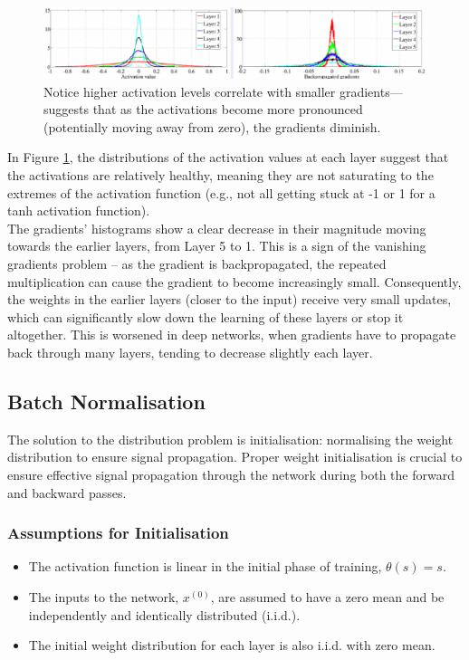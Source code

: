 \begin{figure}[H]
    \centering
    \includegraphics[width=0.75\linewidth]{img/activationgradienthistograms.png}
    \caption{Notice  higher activation levels correlate with smaller gradients—suggests that as the activations become more pronounced (potentially moving away from zero), the gradients diminish. }
    \label{fig:accgradhis}
\end{figure}

In Figure \ref{fig:accgradhis}, the distributions of the activation values at each layer suggest that the activations are relatively healthy, meaning they are not saturating to the extremes of the activation function (e.g., not all getting stuck at -1 or 1 for a tanh activation function).\\

The gradients' histograms show a clear decrease in their magnitude moving towards the earlier layers, from Layer 5 to 1. This is a sign of the vanishing gradients problem – as the gradient is backpropagated, the repeated multiplication can cause the gradient to become increasingly small. Consequently, the weights in the earlier layers (closer to the input) receive very small updates, which can significantly slow down the learning of these layers or stop it altogether. This is worsened in deep networks, when gradients have to propagate back through many layers, tending to decrease slightly each layer.

\subsection{Batch Normalisation}
The solution to the distribution problem is initialisation: normalising the weight distribution to ensure signal propagation. Proper weight initialisation is crucial to ensure effective signal propagation through the network during both the forward and backward passes. 

\subsubsection*{Assumptions for Initialisation}
\begin{itemize}
    \item The activation function is linear in the initial phase of training, \(\theta(s) = s\).
    \item The inputs to the network, \(x^{(0)}\), are assumed to have a zero mean and be independently and identically distributed (i.i.d.).
    \item The initial weight distribution for each layer is also i.i.d. with zero mean.
\end{itemize}


